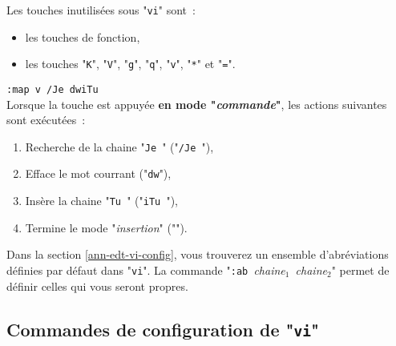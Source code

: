 \begin{remarque}
Les touches inutilis{\'e}es sous "{\tt vi}" sont~:
\begin{itemize}
	\item	les touches de fonction,
	\item	les touches "{\tt K}", "{\tt V}", "{\tt g}",
			"{\tt q}", "{\tt v}", "\verb=*=" et "{\tt =}". 
\end{itemize}
\end{remarque}

\begin{example}
\verb*=:map v /Je =\verb*=dwiTu =
\\[2ex]
Lorsque la touche  est appuy{\'e}e {\bf en mode "{\sl commande}"},
les actions suivantes sont ex{\'e}cut{\'e}es~:
\begin{enumerate}
	\item	Recherche de la chaine "\verb*=Je ="
			("\verb*=/Je ={\esckey}"),
	\item	Efface le mot courrant ("\verb=dw="),
	\item	Ins{\`e}re la chaine "\verb*=Tu ={\esckey}"
			("\verb*=iTu ="),
	\item	Termine le mode "{\sl insertion}" ("{\esckey}").
\end{enumerate}
\end{example}

Dans la section \ref{ann-edt-vi-config}, vous trouverez un ensemble
d'abr{\'e}viations d{\'e}finies par d{\'e}faut dans "{\tt vi}". La commande
"\verb*=:ab ={\sl chaine$_1$}\verb*= ={\sl chaine$_2$}" permet
de d{\'e}finir celles qui vous seront propres.

\subsection{\texorpdfstring{\label{ann-edt-vi-config}Commandes de configuration de "{\tt vi}"}{Commandes de configuration de "vi"}}

